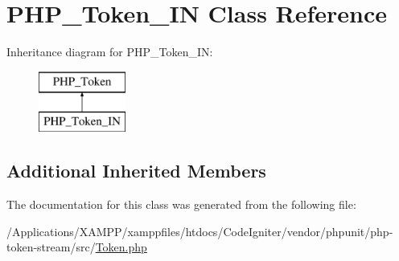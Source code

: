 \hypertarget{class_p_h_p___token___i_n}{}\section{P\+H\+P\+\_\+\+Token\+\_\+\+IN Class Reference}
\label{class_p_h_p___token___i_n}
Inheritance diagram for P\+H\+P\+\_\+\+Token\+\_\+\+IN\+:\begin{figure}[H]
\begin{center}
\leavevmode
\includegraphics[height=2.000000cm]{class_p_h_p___token___i_n}
\end{center}
\end{figure}
\subsection*{Additional Inherited Members}


The documentation for this class was generated from the following file\+:\begin{DoxyCompactItemize}
\item 
/\+Applications/\+X\+A\+M\+P\+P/xamppfiles/htdocs/\+Code\+Igniter/vendor/phpunit/php-\/token-\/stream/src/\mbox{\hyperlink{_token_8php}{Token.\+php}}\end{DoxyCompactItemize}
